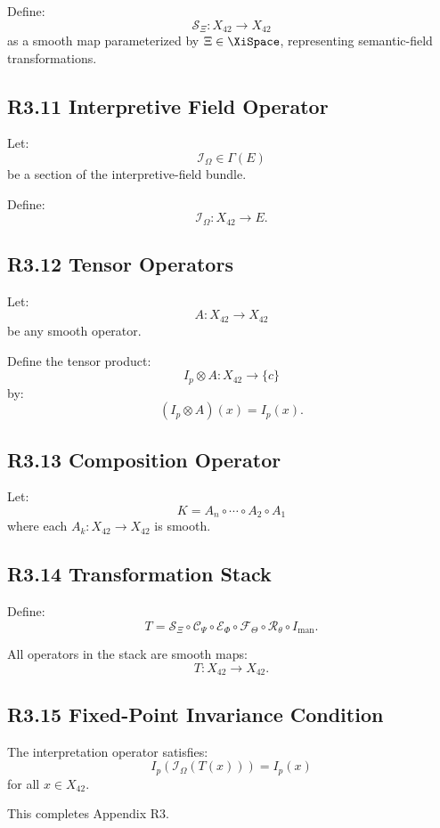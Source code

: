 Define:
\[
\mathcal{S}_{\Xi} : X_{42} \to X_{42}
\]
as a smooth map parameterized by $\Xi \in \XiSpace$, representing
semantic-field transformations.

\subsection*{R3.11 Interpretive Field Operator}

Let:
\[
\mathcal{I}_{\Omega} \in \Gamma(E)
\]
be a section of the interpretive-field bundle.

Define:
\[
\mathcal{I}_{\Omega} : X_{42} \to E.
\]

\subsection*{R3.12 Tensor Operators}

Let:
\[
A : X_{42} \to X_{42}
\]
be any smooth operator.

Define the tensor product:
\[
I_p \otimes A : X_{42} \to \{c\}
\]
by:
\[
(I_p \otimes A)(x) = I_p(x).
\]

\subsection*{R3.13 Composition Operator}

Let:
\[
K = A_n \circ \cdots \circ A_2 \circ A_1
\]
where each $A_k : X_{42} \to X_{42}$ is smooth.

\subsection*{R3.14 Transformation Stack}

Define:
\[
T = 
\mathcal{S}_{\Xi} \circ
\mathcal{C}_{\Psi} \circ
\mathcal{E}_{\Phi} \circ
\mathcal{F}_{\Theta} \circ
\mathcal{R}_{\theta} \circ
I_{\mathrm{man}}.
\]

All operators in the stack are smooth maps:
\[
T : X_{42} \to X_{42}.
\]

\subsection*{R3.15 Fixed-Point Invariance Condition}

The interpretation operator satisfies:
\[
I_p(\mathcal{I}_{\Omega}(T(x))) = I_p(x)
\]
for all $x \in X_{42}$.

This completes Appendix R3.
